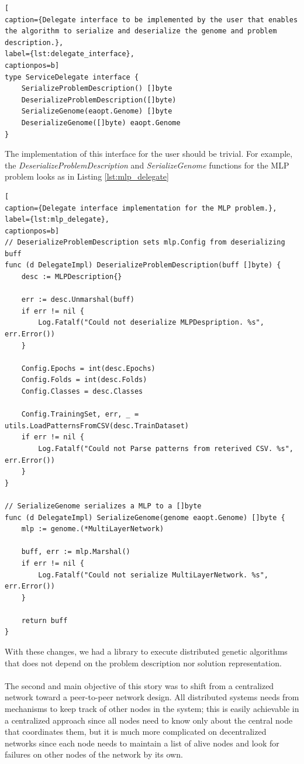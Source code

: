 \begin{lstlisting}[
caption={Delegate interface to be implemented by the user that enables the algorithm to serialize and deserialize the genome and problem description.},
label={lst:delegate_interface},
captionpos=b]
type ServiceDelegate interface {
	SerializeProblemDescription() []byte
	DeserializeProblemDescription([]byte)
	SerializeGenome(eaopt.Genome) []byte
	DeserializeGenome([]byte) eaopt.Genome
}
\end{lstlisting}

The implementation of this interface for the user should be trivial. For example, the \textit{DeserializeProblemDescription} and \textit{SerializeGenome} functions for the MLP problem looks as in Listing \ref{lst:mlp_delegate}

\begin{lstlisting}[
caption={Delegate interface implementation for the MLP problem.},
label={lst:mlp_delegate},
captionpos=b]
// DeserializeProblemDescription sets mlp.Config from deserializing buff
func (d DelegateImpl) DeserializeProblemDescription(buff []byte) {
	desc := MLPDescription{}

	err := desc.Unmarshal(buff)
	if err != nil {
		Log.Fatalf("Could not deserialize MLPDespription. %s", err.Error())
	}

	Config.Epochs = int(desc.Epochs)
	Config.Folds = int(desc.Folds)
	Config.Classes = desc.Classes

	Config.TrainingSet, err, _ = utils.LoadPatternsFromCSV(desc.TrainDataset)
	if err != nil {
		Log.Fatalf("Could not Parse patterns from reterived CSV. %s", err.Error())
	}
}

// SerializeGenome serializes a MLP to a []byte
func (d DelegateImpl) SerializeGenome(genome eaopt.Genome) []byte {
	mlp := genome.(*MultiLayerNetwork)

	buff, err := mlp.Marshal()
	if err != nil {
		Log.Fatalf("Could not serialize MultiLayerNetwork. %s", err.Error())
	}

	return buff
}
\end{lstlisting}

With these changes, we had a library to execute distributed genetic algorithms that does not depend on the problem description nor solution representation.

\paragraph*{}
The second and main objective of this story was to shift from a centralized network toward a peer-to-peer network design.
All distributed systems needs from mechanisms to keep track of other nodes in the system; this is easily achievable in a centralized approach since all nodes need to know only about the central node that coordinates them, but it is much more complicated on decentralized networks since each node needs to maintain a list of alive nodes and look for failures on other nodes of the network by its own.

